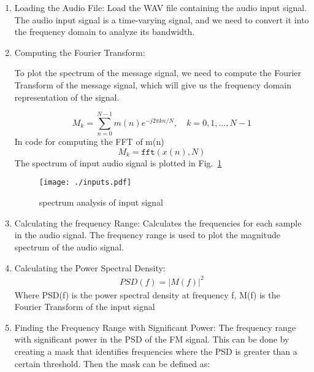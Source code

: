 \documentclass[journal,5pt,twocolumn]{IEEEtran}
\newcommand\figref{Fig.~\ref}
\begin{document}
\begin{enumerate}
\item Loading the Audio File:  Load the WAV file containing the audio input signal.
The audio input signal is a time-varying signal, and we need to convert it into the frequency domain to analyze its bandwidth.



\item Computing the Fourier Transform:

To plot the spectrum of the message signal, we need to compute the Fourier Transform of the message signal, which will give us the frequency domain representation of the signal.

\begin{equation}
M_k = \sum_{n=0}^{N-1} m(n) e^{-j2\pi kn/N}, \quad k=0,1,\dots,N-1
\end{equation}
In code for computing the FFT of m(n)
\begin{equation}
M_k = \texttt{fft}(x(n), N)
\end{equation}
The spectrum of input audio signal is plotted in \figref{fig:input_spectrum}
\begin{figure}
\centering 
\texttt{[image: ./inputs.pdf]}
\caption{spectrum analysis of input signal}
\label{fig:input_spectrum}
\end{figure}

\iffalse
\begin{align*}
M(f) = FFT(m(t))
\end{align*}
Where M(f) is the frequency representation of the signal, m(t) is the input signal
\fi
\item Calculating the frequency Range: Calculates the frequencies for each sample in the audio signal. The frequency range is used to plot the magnitude spectrum of the audio signal.

\item Calculating the Power Spectral Density:
\begin{align*}
PSD(f)=\lvert M(f) \rvert^2 
\end{align*}
Where PSD(f) is the power spectral density at frequency f, M(f) is the Fourier Transform of the input signal

\item Finding the Frequency Range with Significant Power:
The frequency range with significant power in the PSD of the FM signal. This can be done by creating a mask that identifies frequencies where the PSD is greater than a certain threshold. Then the mask can be defined as:


\end{enumerate}
\end{document}

